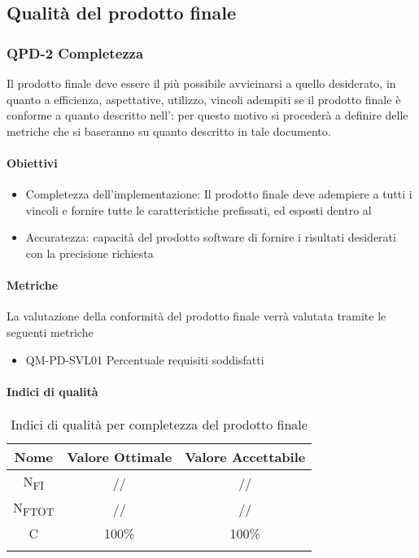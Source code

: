 	\subsection{Qualità del prodotto finale}
	\subsubsection{QPD-2 Completezza}
	Il prodotto finale deve essere il più possibile avvicinarsi a quello desiderato, in quanto a efficienza, aspettative, utilizzo, vincoli adempiti se il prodotto finale è conforme a quanto descritto nell': per questo motivo si procederà a definire delle metriche che si baseranno su quanto descritto in tale documento.
	
		\paragraph{Obiettivi}
			\begin{itemize}
				\item{Completezza dell'implementazione:}
					Il prodotto finale deve adempiere a tutti i vincoli e fornire tutte le caratteristiche prefissati, ed esposti dentro al 
				\item{Accuratezza}: capacità del prodotto software di fornire i risultati desiderati con la precisione richiesta
			\end{itemize}
		
		\paragraph{Metriche}
			La valutazione della conformità del prodotto finale verrà valutata tramite le seguenti metriche
			\begin{itemize}
     				\item  QM-PD-SVL01  Percentuale requisiti soddisfatti
			\end{itemize}
		\paragraph{Indici di qualità}
			\begin{center}
				\begin{longtable}{|c|c|c|}
				\hline
				\rowcolor{lighter-grayer}
				\textbf{Nome} & \textbf{Valore Ottimale} & \textbf{Valore Accettabile}\\
				\hline
				\endfirsthead
				\hline
				N\textsubscript{FI} & // & // \\
				\hline
				N\textsubscript{FTOT} & // & // \\
				\hline				\hline
				C & 100\% & 100\% \\
				\hline
				\caption{Indici di qualità per completezza del prodotto finale}
				\end{longtable}
			\end{center}
				
	
	
	
	
	
	
	
	
	
	
	
	
	
	
	
	